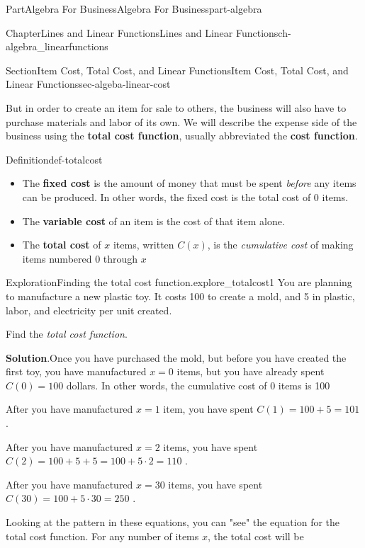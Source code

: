 \documentclass[oneside,10pt,]{tufte-book}
\newcommand{\blocktitlefont}{\relax}
\newcommand{\terminology}[1]{\textbf{#1}}
\numberwithin{equation}{chapter}
\begin{document}
\begin{partptx}{Part}{Algebra For Business}{}{Algebra For Business}{}{}{part-algebra}
\begin{chapterptx}{Chapter}{Lines and Linear Functions}{}{Lines and Linear Functions}{}{}{ch-algebra_linearfunctions}
\begin{sectionptx}{Section}{Item Cost, Total Cost, and Linear Functions}{}{Item Cost, Total Cost, and Linear Functions}{}{}{sec-algeba-linear-cost}
\par
But in order to create an item for sale to others, the business will also have to purchase materials and labor of its own.  We will describe the expense side of the business using the \terminology{total cost function}, usually abbreviated the \terminology{cost function}.%
\begin{definition}{Definition}{}{def-totalcost}%
%
\begin{itemize}[label=\textbullet]
\item{}The \terminology{fixed cost} is the amount of money that must be spent \emph{before} any items can be produced.  In other words, the fixed cost is the total cost of 0 items.%
\item{}The \terminology{variable cost} of an item is the cost of that item alone.%
\item{}The \terminology{total cost} of \(x\) items, written \(C(x)\), is the \emph{cumulative cost} of making items numbered \(0\) through \(x\)%
\end{itemize}
%
\end{definition}
\begin{exploration}{Exploration}{Finding the total cost function.}{explore_totalcost1}%
You are planning to manufacture a new plastic toy. It costs \textdollar{}100 to create a mold, and \textdollar{}5 in plastic, labor, and electricity per unit created.%
\par
Find the \emph{total cost function}.%
\par\smallskip%
\noindent\textbf{\blocktitlefont Solution}.\hypertarget{explore_totalcost1-3}{}\quad{}Once you have purchased the mold, but before you have created the first toy, you have manufactured \(x=0\) items, but you have already spent \(C(0)=100\) dollars.  In other words, the cumulative cost of 0 items is 100\textdollar{}%
\par
After you have manufactured \(x=1\) item, you have spent \(C(1) = 100 + 5 = 101 \) \textdollar{}.%
\par
After you have manufactured \(x=2\) items, you have spent \(C(2) = 100 + 5 + 5 =  100 + 5\cdot 2 =  110 \) \textdollar{}.%
\par
After you have manufactured \(x=30\) items, you have spent \(C(30) = 100 + 5\cdot 30 = 250 \) \textdollar{}.%
\par
Looking at the pattern in these equations, you can "see" the equation for the total cost  function.  For any number of items \(x\), the total cost will be%
\begin{equation*}

\end{equation*}
\end{exploration}
\end{sectionptx}
\end{chapterptx}
\end{partptx}
\end{document}
